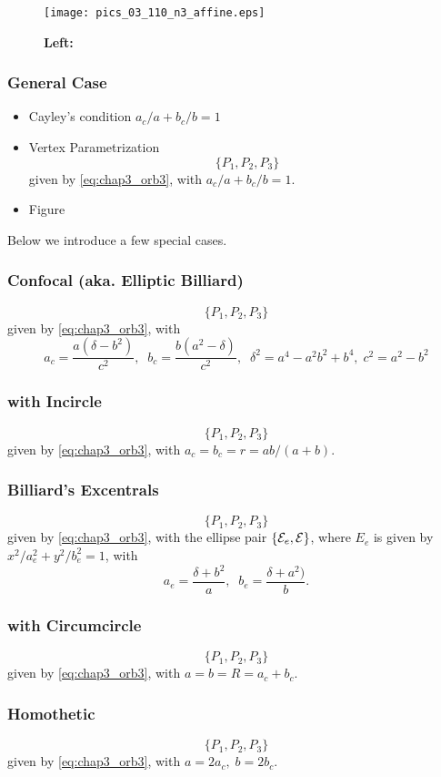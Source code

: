 \begin{figure}
    \centering
    \texttt{[image: pics\_03\_110\_n3\_affine.eps]}
    \caption{\textbf{Left:} }
    \label{fig:n3-affine}
\end{figure}

\subsubsection{General Case}

\begin{itemize}
    \item Cayley's condition $a_c/a+b_c/b=1$
    \item Vertex Parametrization
    \[ \{ P_1,P_2,P_3\} \] given by \cref{eq:chap3_orb3}, with
     $a_c/a+b_c/b=1$.
    \item Figure
\end{itemize}

Below we introduce a few special cases.

\subsubsection{Confocal (aka. Elliptic Billiard)}
 \[ \{ P_1,P_2,P_3\} \] given by \cref{eq:chap3_orb3}, 
with
   \[ a_c=\frac{a(\delta-b^2)}{c^2}, \;\; b_c=\frac{b(a^2-\delta)}{c^2},\;\; \delta^2=a^4-a^2b^2+b^4, \; c^2=a^2-b^2\]
\subsubsection{with Incircle}
 \[ \{ P_1,P_2,P_3\} \] given by \cref{eq:chap3_orb3}, with $a_c=b_c=r=ab/(a+b)$.

\subsubsection{Billiard's Excentrals}
 \[ \{ P_1,P_2,P_3\} \] given by \cref{eq:chap3_orb3}, 
with the ellipse pair $\{ \mathcal{E}_e ,\mathcal{E}\}$, where
$
E_e$ is given by $x^2/a_e^2+y^2/b_e^2=1$, with
   \[ a_e=\frac{\delta+b^2}{a}, \;\; b_e=\frac{\delta+a^2)}{b}.  \]
\subsubsection{with Circumcircle}
 \[ \{ P_1,P_2,P_3\} \] given by \cref{eq:chap3_orb3}, with $a=b =R=a_c+b_c$.
\subsubsection{Homothetic}
 \[ \{ P_1,P_2,P_3\} \] given by \cref{eq:chap3_orb3}, with $a=2a_c,\; b=2b_c$.
 
